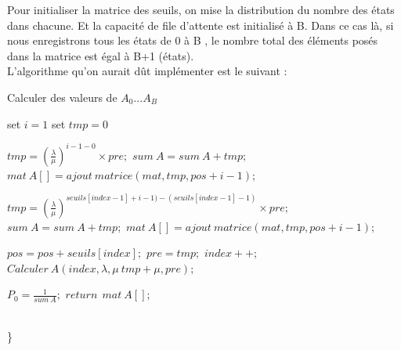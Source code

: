 \noindent Pour initialiser la matrice des seuils, on mise la distribution du nombre des états dans chacune. Et la capacité de file d'attente est initialisé à B. Dans ce cas là, si nous enregistrons tous les états de 0 à B , le nombre total des éléments posés dans la matrice est égal à B+1 (états). 
\quad \\
\noindent L’algorithme qu’on aurait dût implémenter est le suivant :
\begin{algorithm}
\caption{Calculer des valeurs de $A_{0}$...$A_{B}$}


\label{alg:Calculer des valeurs de A}
\begin{algorithmic}
\STATE set $i=1$ 
\STATE set $tmp=0$ 

\REPEAT 
{}
\STATE $tmp=\left ( \frac{\lambda }{\mu }\right )^{i-1-0}\times pre;$ 
\STATE $sum\:A=sum\:A + tmp;$ 
\STATE $mat\:A[]=ajout\:matrice(mat,tmp,pos+i-1);$ 
\ENDFOR

\ELSE
{}
\STATE $tmp=\left ( \frac{\lambda }{\mu }\right )^{seuils[index-1]+i-1)-(seuils[index-1]-1)}\times pre;$ 
\STATE $sum\:A=sum\:A + tmp;$ 
\STATE $mat\:A[]=ajout\:matrice(mat,tmp,pos+i-1);$ 
\ENDFOR
\ENDIF

\STATE $pos = pos+seuils[index];$ 
\STATE $pre = tmp;$ 
\STATE $index++;$ 
\STATE $Calculer\:A(index,\lambda,\mu\:tmp + \mu,pre);$ 



\ELSE
\STATE $P_{0}=\frac{1}{sum\:A};$
\STATE $return\:\: mat\:A[];$
\ENDIF

\\\}
\end{algorithmic}
\end{algorithm}

